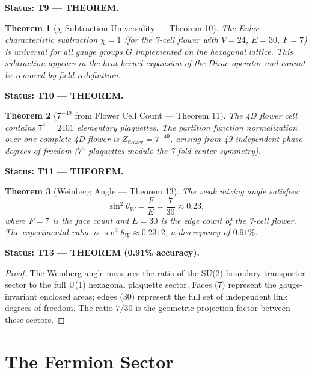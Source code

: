 \documentclass[11pt,letterpaper]{article}
\newtheorem{theorem}{Theorem}[section]
\begin{document}
\textbf{Status: T9 --- THEOREM.}

\begin{theorem}[$\chi$-Subtraction Universality --- Theorem 10]\label{thm:T10}
The Euler characteristic subtraction $\chi = 1$ (for the 7-cell flower with
$V=24$, $E=30$, $F=7$) is universal for all gauge groups $G$ implemented on
the hexagonal lattice.  This subtraction appears in the heat kernel expansion
of the Dirac operator and cannot be removed by field redefinition.
\end{theorem}

\textbf{Status: T10 --- THEOREM.}

\begin{theorem}[$7^{-49}$ from Flower Cell Count --- Theorem 11]\label{thm:T11}
The 4D flower cell contains $7^4 = 2401$ elementary plaquettes.
The partition function normalization over one complete 4D flower is
$Z_\mathrm{flower} = 7^{-49}$, arising from 49 independent phase degrees
of freedom ($7^4$ plaquettes modulo the 7-fold center symmetry).
\end{theorem}

\textbf{Status: T11 --- THEOREM.}

\begin{theorem}[Weinberg Angle --- Theorem 13]\label{thm:T13}
The weak mixing angle satisfies:
\begin{equation}
  \sin^2\!\theta_W = \frac{F}{E} = \frac{7}{30} \approx 0.2\overline{3},
\end{equation}
where $F=7$ is the face count and $E=30$ is the edge count of the 7-cell flower.
The experimental value is $\sin^2\!\theta_W \approx 0.2312$, a discrepancy
of $0.91\%$.
\end{theorem}

\textbf{Status: T13 --- THEOREM (0.91\% accuracy).}

\begin{proof}
The Weinberg angle measures the ratio of the SU(2) boundary transporter
sector to the full U(1) hexagonal plaquette sector.  Faces (7) represent
the gauge-invariant enclosed areas; edges (30) represent the full set of
independent link degrees of freedom.  The ratio $7/30$ is the geometric
projection factor between these sectors.
\end{proof}

%
%
\newpage
\part{The Fermion Sector}
\end{document}
